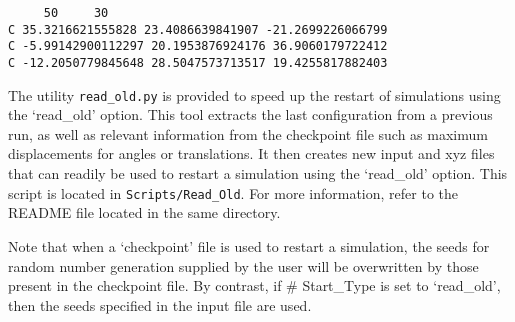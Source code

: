\begin{itemize}
\texttt{
 \ \ \ \ 50 \ \ \ \ 30\\
 C    35.3216621555828        23.4086639841907       -21.2699226066799\\
 C   -5.99142900112297        20.1953876924176        36.9060179722412\\
 C   -12.2050779845648        28.5047573713517        19.4255817882403\\
}

The utility \texttt{read\_old.py} is provided to speed up the restart of simulations using the `read\_old' option.
This tool extracts the last configuration from a previous run, as well as relevant information from the checkpoint file 
such as maximum displacements for angles or translations. It then creates new input and xyz files that can readily be
used to restart a simulation using the `read\_old' option. This script is located in \texttt{Scripts/Read\_Old}. For more information, refer to
the README file located in the same directory.
\end{itemize}

Note that when a `checkpoint' file is used to restart a simulation, the seeds for random number generation supplied by the user
will be overwritten by those present in the checkpoint file. By contrast, if \# Start\_Type is set to `read\_old', 
then the seeds specified in the input file are used.  \\ \\

%
%
%
